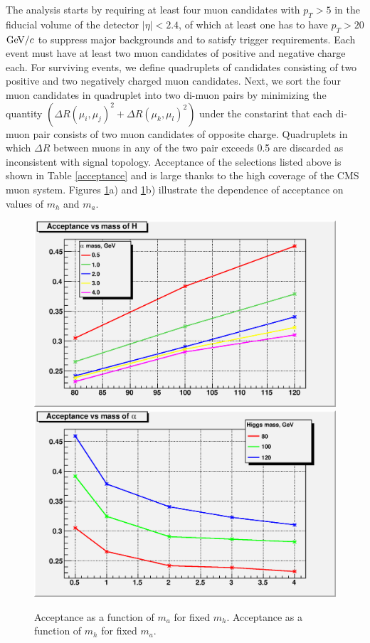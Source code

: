\documentclass[aps,prl,twocolumn,nofootinbib,superscriptaddress]{revtex4}
\begin{document}
The analysis starts by requiring at least four muon candidates with $p_T>5$ \gevc in the fiducial 
volume of the detector $|\eta|<2.4$, of which at least one has to have $p_T>20$ $\mbox{${\rm GeV}/c$}$ to suppress 
major backgrounds and to satisfy trigger requirements. Each event must have at least two muon 
candidates of positive and negative charge each. For surviving events, we define quadruplets of 
candidates consisting of two positive and two negatively charged muon candidates. Next, we sort the 
four muon candidates in quadruplet into two di-muon pairs by minimizing the quantity 
$(\Delta R(\mu_i,\mu_j)^2 + \Delta R (\mu_k,\mu_l)^2)$ under the constarint that each di-muon pair
consists of two muon candidates of opposite charge. Quadruplets in which $\Delta R$ between 
muons in any of the two pair exceeds 0.5 are discarded as inconsistent with signal topology. 
Acceptance of the selections listed above is shown in Table \ref{acceptance} and is large thanks to
the high coverage of the CMS muon system. Figures \ref{signal_acceptance}a) and 
\ref{signal_acceptance}b) illustrate the dependence of acceptance on values of $m_h$ and $m_a$. 

\begin{figure}[htb]
\begin{center}
\includegraphics[width=0.48\linewidth]{plots/acceptance_H.eps}
\includegraphics[width=0.48\linewidth]{plots/acceptance_a.eps}
\caption{Acceptance as a function of $m_a$ for fixed $m_h$. Acceptance as a function of $m_h$ for fixed $m_a$.}
\label{signal_acceptance}
\end{center}
\end{figure}
\end{document}
